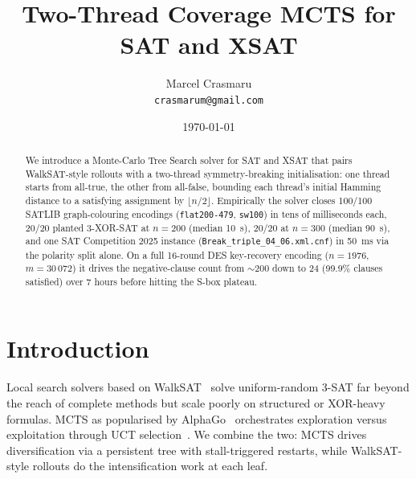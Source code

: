 \documentclass[11pt]{article}
\title{Two-Thread Coverage MCTS for SAT and XSAT}
\author{Marcel Crasmaru\\\small\texttt{crasmarum@gmail.com}}
\date{\today}
\begin{document}
\maketitle

\begin{abstract}
We introduce a Monte-Carlo Tree Search solver for SAT and XSAT that
pairs WalkSAT-style rollouts with a two-thread symmetry-breaking
initialisation: one thread starts from all-true, the other from
all-false, bounding each thread's initial Hamming distance to a
satisfying assignment by $\lfloor n/2 \rfloor$. Empirically the
solver closes 100/100 SATLIB graph-colouring encodings
(\texttt{flat200-479}, \texttt{sw100}) in tens of milliseconds each,
20/20 planted 3-XOR-SAT at $n{=}200$ (median 10~s), 20/20 at
$n{=}300$ (median 90~s), and one SAT Competition 2025 instance
(\texttt{Break\_triple\_04\_06.xml.cnf}) in 50~ms via the polarity
split alone. On a full 16-round DES key-recovery encoding ($n{=}1976$,
$m{=}30\,072$) it drives the negative-clause count from $\sim 200$
down to 24 (99.9\% clauses satisfied) over 7 hours before hitting the
S-box plateau.
\end{abstract}

\section{Introduction}
\label{sec:intro}

Local search solvers based on WalkSAT~\cite{selman:walksat} solve
uniform-random 3-SAT far beyond the reach of complete methods but
scale poorly on structured or XOR-heavy formulas. MCTS as popularised
by AlphaGo~\cite{silver:alphago} orchestrates exploration versus
exploitation through UCT selection~\cite{kocsis:uct}. We combine the
two: MCTS drives diversification via a persistent tree with
stall-triggered restarts, while WalkSAT-style rollouts do the
intensification work at each leaf.
\end{document}
